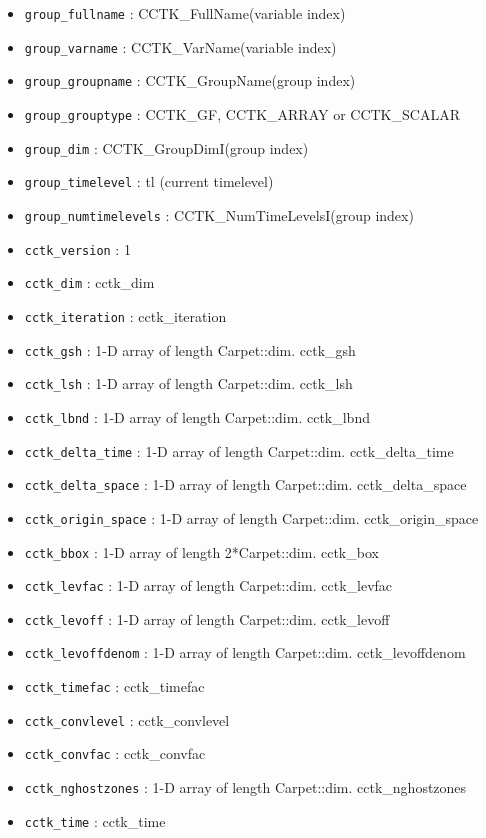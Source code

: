 \begin{itemize}
\begin{itemize}
    \item {\tt group\_fullname} : CCTK\_FullName(variable index)
    \item {\tt group\_varname} : CCTK\_VarName(variable index)
    \item {\tt group\_groupname} : CCTK\_GroupName(group index)
    \item {\tt group\_grouptype} : CCTK\_GF, CCTK\_ARRAY or CCTK\_SCALAR
    \item {\tt group\_dim} : CCTK\_GroupDimI(group index)
    \item {\tt group\_timelevel} : tl (current timelevel)
    \item {\tt group\_numtimelevels} : CCTK\_NumTimeLevelsI(group index)
    \item {\tt cctk\_version} : 1
    \item {\tt cctk\_dim} : cctk\_dim
    \item {\tt cctk\_iteration} : cctk\_iteration
    \item {\tt cctk\_gsh} : 1-D array of length Carpet::dim. cctk\_gsh
    \item {\tt cctk\_lsh} : 1-D array of length Carpet::dim. cctk\_lsh
    \item {\tt cctk\_lbnd} : 1-D array of length Carpet::dim. cctk\_lbnd
    \item {\tt cctk\_delta\_time} : 1-D array of length Carpet::dim. cctk\_delta\_time
    \item {\tt cctk\_delta\_space} : 1-D array of length Carpet::dim. cctk\_delta\_space
    \item {\tt cctk\_origin\_space} : 1-D array of length Carpet::dim. cctk\_origin\_space
    \item {\tt cctk\_bbox} : 1-D array of length 2*Carpet::dim. cctk\_box
    \item {\tt cctk\_levfac} : 1-D array of length Carpet::dim. cctk\_levfac
    \item {\tt cctk\_levoff} : 1-D array of length Carpet::dim. cctk\_levoff
    \item {\tt cctk\_levoffdenom} : 1-D array of length Carpet::dim. cctk\_levoffdenom
    \item {\tt cctk\_timefac} : cctk\_timefac
    \item {\tt cctk\_convlevel} : cctk\_convlevel
    \item {\tt cctk\_convfac} : cctk\_convfac
    \item {\tt cctk\_nghostzones} : 1-D array of length Carpet::dim. cctk\_nghostzones
    \item {\tt cctk\_time} : cctk\_time

\end{itemize}
\end{itemize}
